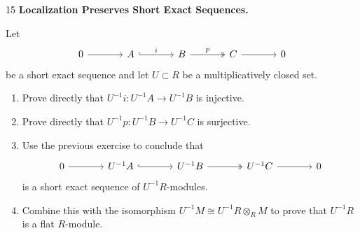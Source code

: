 \documentclass[Notebook.tex]{subfiles}
\begin{document}
\begin{problem}{15}
    \textbf{Localization Preserves Short Exact Sequences.} 
    
    Let
    \[
    \begin{tikzcd}[column sep=large]
    0 \arrow[r] & A \arrow[r, hook, "i"] & B \arrow[r, two heads, "p"] & C \arrow[r] & 0
    \end{tikzcd}
    \]
    be a short exact sequence and let $U\subset R$ be a multiplicatively closed set.
    \begin{enumerate}
        \item Prove directly that $U^{-1}i:U^{-1}A\to U^{-1}B$ is injective.
        \item Prove directly that $U^{-1}p:U^{-1}B\to U^{-1}C$ is surjective.
        \item Use the previous exercise to conclude that
        \[
        \begin{tikzcd}[column sep=large]
        0 \arrow[r] & U^{-1}A \arrow[r, hook] & U^{-1}B \arrow[r, two heads] & U^{-1}C \arrow[r] & 0
        \end{tikzcd}
        \]
        is a short exact sequence of $U^{-1}R$-modules.
        \item Combine this with the isomorphism $U^{-1}M\cong U^{-1}R\otimes_R M$ to prove that $U^{-1}R$ is a flat $R$-module.
    \end{enumerate}
\end{problem}
\end{document}
